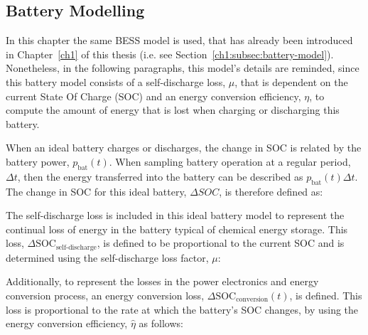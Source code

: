 

\subsection{Battery Modelling}

In this chapter the same BESS model is used, that has already been introduced in Chapter~\ref{ch1} of this thesis (i.e. see Section~\ref{ch1:subsec:battery-model}).
Nonetheless, in the following paragraphs, this model's details are reminded, since this battery model consists of a self-discharge loss, $\mu$, that is dependent on the current State Of Charge (SOC) and an energy conversion efficiency, $\eta$, to compute the amount of energy that is lost when charging or discharging this battery. 


When an ideal battery charges or discharges, the change in SOC is related by the battery power, $p_\text{bat}(t)$.
When sampling battery operation at a regular period, $\Delta t$, then the energy transferred into the battery can be described as $p_\text{bat}(t)\Delta t$.
The change in SOC for this ideal battery, $\Delta SOC$, is therefore defined as:



The self-discharge loss is included in this ideal battery model to represent the continual loss of energy in the battery typical of chemical energy storage.
This loss, $\Delta\text{SOC}_\text{self-discharge}$, is defined to be proportional to the current SOC and is determined using the self-discharge loss factor, $\mu$:



Additionally, to represent the losses in the power electronics and energy conversion process, an energy conversion loss, $\Delta\text{SOC}_\text{conversion}(t)$, is defined.
This loss is proportional to the rate at which the battery's SOC changes, by using the energy conversion efficiency, $\hat{\eta}$ as follows:

